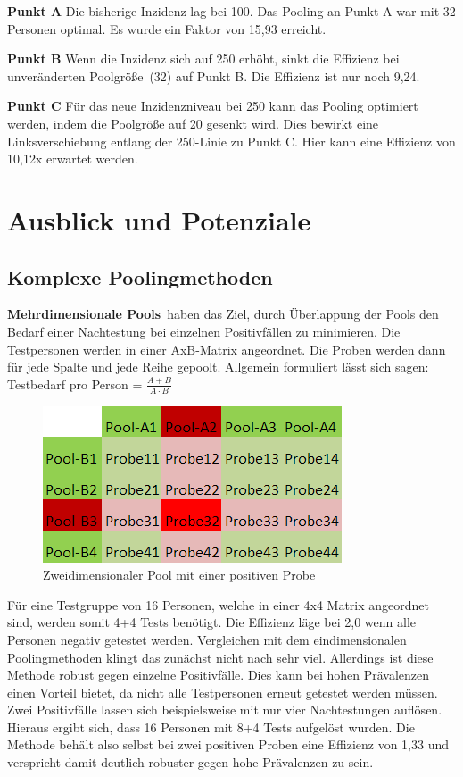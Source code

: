 \textbf{Punkt A}\newline
Die bisherige Inzidenz lag bei 100.
Das Pooling an Punkt A war mit 32 Personen optimal.
Es wurde ein Faktor von 15,93 erreicht.

\textbf{Punkt B}\newline
Wenn die Inzidenz sich auf 250 erhöht, sinkt die Effizienz bei unveränderten \mbox{Poolgröße (32)} auf Punkt B.
Die Effizienz ist nur noch 9,24.

\textbf{Punkt C}\newline
Für das neue Inzidenzniveau bei 250 kann das Pooling optimiert werden, indem die Poolgröße auf 20 gesenkt wird.
Dies bewirkt eine Linksverschiebung entlang der 250-Linie zu Punkt C.
Hier kann eine Effizienz von 10,12x erwartet werden.


\cleardoublepage
\chapter{Ausblick und Potenziale}
\section{Komplexe Poolingmethoden}
\textbf{Mehrdimensionale Pools}\ haben das Ziel, durch Überlappung der Pools den Bedarf einer Nachtestung bei einzelnen Positivfällen zu minimieren.
Die Testpersonen werden in einer AxB-Matrix angeordnet.
Die Proben werden dann für jede Spalte und jede Reihe gepoolt.
Allgemein formuliert lässt sich sagen:
Testbedarf pro Person =
$\frac{A+B}{A\cdot B}$

\begin{figure}[h]
	\centering
	\includegraphics[width=.4\textwidth]{img/2d_Pool_1Positiv}
	\caption{Zweidimensionaler Pool mit einer positiven Probe\footnotemark}
\end{figure}
Für eine Testgruppe von 16 Personen, welche in einer 4x4 Matrix angeordnet sind, werden somit 4+4 Tests benötigt.
Die Effizienz läge bei 2,0 wenn alle Personen negativ getestet werden.
Vergleichen mit dem eindimensionalen Poolingmethoden klingt das zunächst nicht nach sehr viel.
Allerdings ist diese Methode robust gegen einzelne Positivfälle.
Dies kann bei hohen Prävalenzen einen Vorteil bietet, da nicht alle Testpersonen erneut getestet werden müssen.
Zwei Positivfälle lassen sich beispielsweise mit nur vier Nachtestungen auflösen.
Hieraus ergibt sich, dass 16 Personen mit 8+4 Tests aufgelöst wurden.
Die Methode behält also selbst bei zwei positiven Proben eine Effizienz von 1,33 und verspricht damit deutlich robuster gegen hohe Prävalenzen zu sein.

